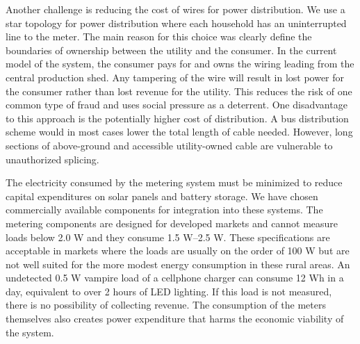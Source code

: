 \documentclass{sig-alternate}
\begin{document}
Another challenge is reducing the cost of wires for power distribution.
We use a star topology for power distribution where each household has an
uninterrupted line to the meter.
The main reason for this
choice was clearly define the boundaries of ownership between the utility
and the consumer.
In the current model of the system, the consumer pays for
and owns the wiring leading from the central production shed.  Any tampering
of the wire will result in lost power for the consumer rather than lost
revenue for the utility.  This reduces the risk of one common type of fraud
and uses social pressure as a deterrent.
One disadvantage to this approach is the potentially higher cost of distribution.
A bus distribution scheme would in most cases lower the total length of
cable needed.  However, long sections of above-ground and accessible
utility-owned cable are vulnerable to unauthorized splicing.

The electricity consumed by the metering system must be minimized to
reduce capital expenditures on solar panels and battery storage.  We
have chosen commercially available components for integration into
these systems.  The metering components are designed for developed markets
and cannot measure loads below 2.0 W and they consume 1.5 W--2.5 W.  These
specifications are acceptable in markets where the loads are usually
on the order of 100 W but are not well suited for the more modest
energy consumption in these rural areas.  An undetected 0.5 W vampire load of a
cellphone charger can consume 12 Wh in a day, equivalent to over 2 hours
of LED lighting.  If this load is not measured, there
is no possibility of collecting revenue.  The consumption of the meters
themselves also creates power expenditure that harms the economic viability
of the system.
\end{document}
